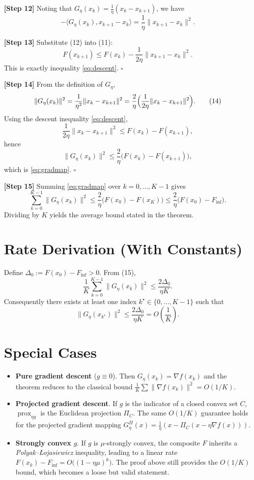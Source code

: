 \documentclass[11pt]{article}
\begin{document}
\noindent\textbf{[Step 12]} Noting that $G_{\eta}(x_{k})=\frac{1}{\eta}(x_{k}-x_{k+1})$, we have
\[
-\langle G_{\eta}(x_{k}),x_{k+1}-x_{k}\rangle
= \frac{1}{\eta}\|x_{k+1}-x_{k}\|^{2}.
\tag{12}
\]

\noindent\textbf{[Step 13]} Substitute (12) into (11):
\[
F(x_{k+1})\le F(x_{k})-\frac{1}{2\eta}\|x_{k+1}-x_{k}\|^{2}.
\tag{13}
\]
This is exactly inequality \eqref{eq:descent}. \hfill $\square$

\noindent\textbf{[Step 14]} From the definition of $G_{\eta}$,
\[
\|G_{\eta}(x_{k})\|^{2}= \frac{1}{\eta^{2}}\|x_{k}-x_{k+1}\|^{2}
= \frac{2}{\eta}\Bigl(\frac{1}{2\eta}\|x_{k}-x_{k+1}\|^{2}\Bigr).
\tag{14}
\]
Using the descent inequality \eqref{eq:descent},
\[
\frac{1}{2\eta}\|x_{k}-x_{k+1}\|^{2}\le F(x_{k})-F(x_{k+1}),
\]
hence
\[
\|G_{\eta}(x_{k})\|^{2}\le \frac{2}{\eta}\bigl(F(x_{k})-F(x_{k+1})\bigr),
\]
which is \eqref{eq:gradmap}. \hfill $\square$

\noindent\textbf{[Step 15]} Summing \eqref{eq:gradmap} over $k=0,\dots,K-1$ gives
\[
\sum_{k=0}^{K-1}\|G_{\eta}(x_{k})\|^{2}
\le \frac{2}{\eta}\bigl(F(x_{0})-F(x_{K})\bigr)
\le \frac{2}{\eta}\bigl(F(x_{0})-F_{\inf}\bigr).
\tag{15}
\]
Dividing by $K$ yields the average bound stated in the theorem.

\section*{Rate Derivation (With Constants)}
Define $\Delta_{0}:=F(x_{0})-F_{\inf}>0$. From (15),
\[
\frac{1}{K}\sum_{k=0}^{K-1}\|G_{\eta}(x_{k})\|^{2}\le \frac{2\Delta_{0}}{\eta K}.
\]
Consequently there exists at least one index $k^{\star}\in\{0,\dots,K-1\}$ such that
\[
\|G_{\eta}(x_{k^{\star}})\|^{2}\le \frac{2\Delta_{0}}{\eta K}=O\!\left(\frac{1}{K}\right).
\]

\section*{Special Cases}
\begin{itemize}
\item \textbf{Pure gradient descent} ($g\equiv0$). Then $G_{\eta}(x_{k})=\nabla f(x_{k})$ and the theorem reduces to the classical bound $\frac{1}{K}\sum\|\nabla f(x_{k})\|^{2}=O(1/K)$.
\item \textbf{Projected gradient descent}. If $g$ is the indicator of a closed convex set $C$, $\operatorname{prox}_{\eta g}$ is the Euclidean projection $\Pi_{C}$. The same $O(1/K)$ guarantee holds for the projected gradient mapping $G_{\eta}^{\Pi}(x)=\frac{1}{\eta}(x-\Pi_{C}(x-\eta\nabla f(x)))$.
\item \textbf{Strongly convex $g$}. If $g$ is $\mu$‑strongly convex, the composite $F$ inherits a \emph{Polyak–Łojasiewicz} inequality, leading to a linear rate $F(x_{k})-F_{\inf}=O\bigl((1-\eta\mu)^{k}\bigr)$. The proof above still provides the $O(1/K)$ bound, which becomes a loose but valid statement.
\end{itemize}
\end{document}
